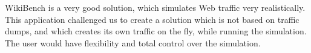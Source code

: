 WikiBench is a very good solution, which simulates Web traffic very realistically. This application challenged us to create a solution which is not based on traffic dumps, and which creates its own traffic on the fly, while running the simulation. The user would have flexibility and total control over the simulation.
